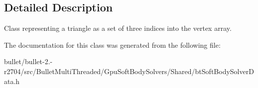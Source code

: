 \subsection{Detailed Description}
Class representing a triangle as a set of three indices into the vertex array. 

The documentation for this class was generated from the following file\+:\begin{DoxyCompactItemize}
\item 
bullet/bullet-\/2.-\/r2704/src/\+Bullet\+Multi\+Threaded/\+Gpu\+Soft\+Body\+Solvers/\+Shared/bt\+Soft\+Body\+Solver\+Data.\+h\end{DoxyCompactItemize}
